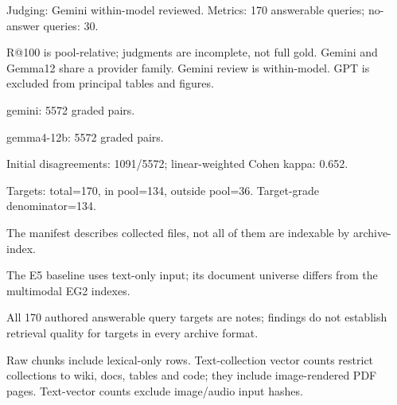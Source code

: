 \begingroup\raggedright
Judging: Gemini within-model reviewed. Metrics: 170 answerable queries; no-answer queries: 30.
\par
R@100 is pool-relative; judgments are incomplete, not full gold. Gemini and Gemma12 share a provider family. Gemini review is within-model. GPT is excluded from principal tables and figures.
\par
gemini: 5572 graded pairs.
\par
gemma4-12b: 5572 graded pairs.
\par
Initial disagreements: 1091/5572; linear-weighted Cohen kappa: 0.652.
\par
Targets: total=170, in pool=134, outside pool=36. Target-grade denominator=134.
\par
The manifest describes collected files, not all of them are indexable by archive-index.
\par
The E5 baseline uses text-only input; its document universe differs from the multimodal EG2 indexes.
\par
All 170 authored answerable query targets are notes; findings do not establish retrieval quality for targets in every archive format.
\par
Raw chunks include lexical-only rows. Text-collection vector counts restrict collections to wiki, docs, tables and code; they include image-rendered PDF pages. Text-vector counts exclude image/audio input hashes.
\par\endgroup
